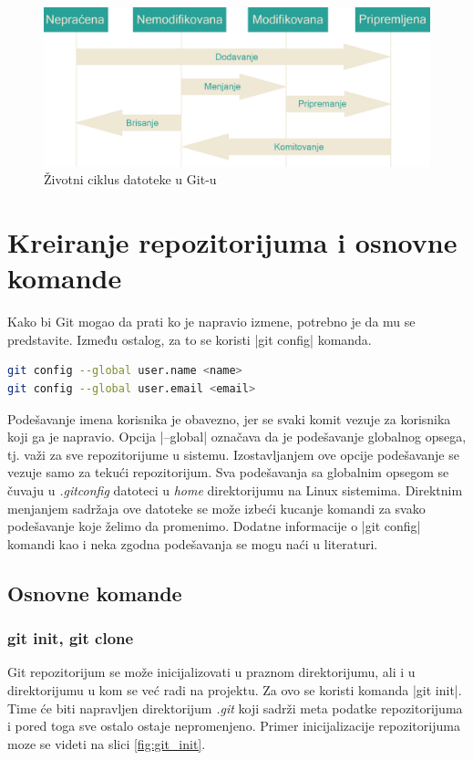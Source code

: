 \documentclass[a4paper]{article}
\begin{document}
{\begin{figure}[h!]
\begin{center}
\includegraphics[scale=0.18]{images/lifecycle2.png}
\end{center}
\caption{Životni ciklus datoteke u Git-u}
\label{fig:git_lifecycle}
\end{figure}


\section{Kreiranje repozitorijuma i osnovne komande}
\label{sec:kreiranje}

Kako bi Git mogao da prati ko je napravio izmene, potrebno je da mu se predstavite. Između ostalog, za to se koristi  |git config| komanda.

\begin{lstlisting}[language=bash]
git config --global user.name <name>
git config --global user.email <email>
\end{lstlisting}

\noindent
Podešavanje imena korisnika je obavezno, jer se svaki komit vezuje za korisnika koji ga je napravio. Opcija |--global| označava da je podešavanje globalnog opsega, tj. važi za sve repozitorijume u sistemu. Izostavljanjem ove opcije podešavanje se vezuje samo za tekući repozitorijum. Sva podešavanja sa globalnim opsegom se čuvaju u \textit{.gitconfig} datoteci u \textit{home} direktorijumu na Linux sistemima. Direktnim menjanjem sadržaja ove datoteke se može izbeći kucanje komandi za svako podešavanje koje želimo da promenimo. Dodatne informacije o |git config| komandi kao i neka zgodna podešavanja se mogu naći u literaturi.

\subsection{Osnovne komande}
\label{osnovne_komande}

\subsubsection*{git init, git clone}
\label{subsec:git_init}
Git repozitorijum se može inicijalizovati u praznom direktorijumu, ali i u direktorijumu u kom se već radi na projektu. Za ovo se koristi komanda |git init|. Time će biti napravljen direktorijum \textit{.git} koji sadrži meta podatke repozitorijuma i pored toga sve ostalo ostaje nepromenjeno. Primer inicijalizacije repozitorijuma moze se videti na slici \ref{fig:git_init}.

}
\end{document}
